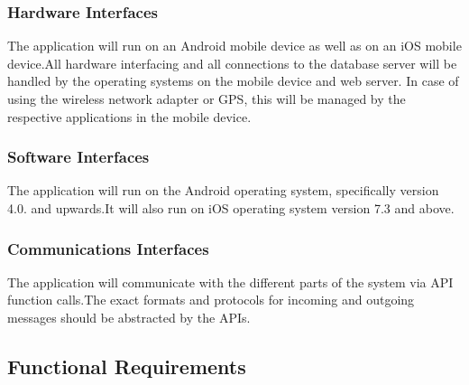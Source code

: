 \documentclass[a4paper,10pt]{article}
\begin{document}
                 \subsubsection{Hardware Interfaces}
The application will run on an Android mobile device as well as on an iOS mobile device.All hardware interfacing and all connections to the database server will be handled by the operating systems on the mobile device and web server. In case of using the wireless network adapter or GPS, this will be managed by the respective applications in the mobile device.

                 \subsubsection{Software Interfaces}
The application will run on the Android operating system, specifically version 4.0. and upwards.It will also run on iOS operating system version 7.3 and above.

                 \subsubsection{Communications Interfaces}
The application will communicate with the different parts of the system via API function calls.The exact formats and protocols for incoming and outgoing messages should be abstracted by the APIs.

	\subsection{Functional Requirements}
\end{document}
